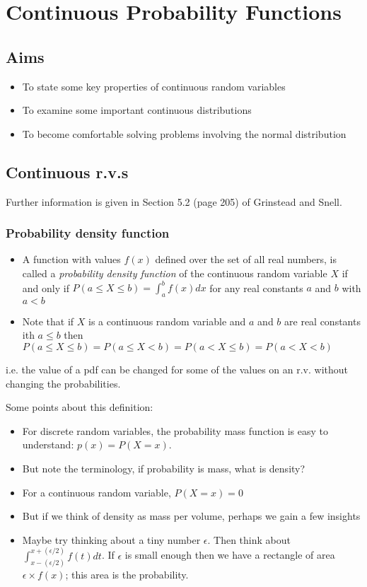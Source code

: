 \documentclass[12pt]{extbook}
\begin{document}
\chapter{Continuous Probability Functions}

\section*{Aims}
\begin{itemize}
\item To state some key properties of continuous random variables
\item To examine some important continuous distributions
\item To become comfortable solving problems involving the normal distribution
\end{itemize}


\section{Continuous r.v.s}

Further information is given in Section 5.2 (page 205) of Grinstead and Snell.

\subsection{Probability density function}

\begin{itemize}
\item A function with values $f(x)$ defined over the set of all real numbers, is called a \emph{probability density function} of the continuous random variable $X$ if and only if $P(a \leq X \leq b) = \int_{a}^{b} f(x) dx$ for any real constants $a$ and $b$ with $a < b$
\item Note that if $X$ is a continuous random variable and $a$ and $b$ are real constants ith $a \leq b$ then $P(a \leq X \leq b) = P(a \leq X < b) = P(a < X \leq b) = P(a < X < b)$
\end{itemize}
i.e. the value of a pdf can be changed for some of the values on an r.v. without changing the probabilities.


Some points about this definition:
\begin{itemize}
\item For discrete random variables, the probability mass function is easy to understand: $p(x) = P(X=x)$.
\item But note the terminology, if probability is mass, what is density?
\item For a continuous random variable, $P(X=x)=0$
\item But if we think of density as mass per volume, perhaps we gain a few insights
\item Maybe try thinking about a tiny number $\epsilon$.  Then think about $\int_{x-(\epsilon/2)}^{x+(\epsilon/2)} f(t)dt$.   If $\epsilon$ is small enough then we have a rectangle of area $\epsilon \times f(x)$; this area is the probability.
\end{itemize}
\end{document}
